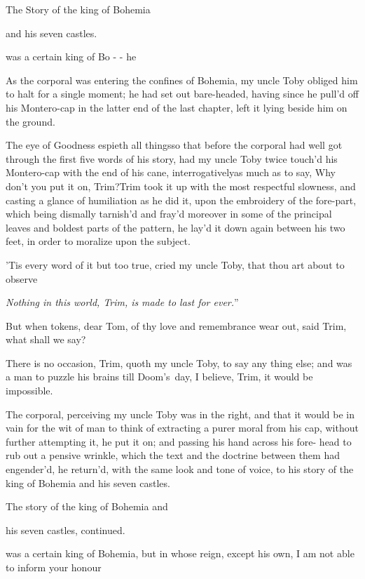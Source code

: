 \documentclass{article}
\begin{document}
\null\smallskip
\centerline{The Story of the king of Bohemia}
\centerline{and his seven castles.}

 was a certain king of\break
Bo - - he\tsh

As the corporal was entering the confines of Bohemia, my
uncle Toby obliged him to halt for a single moment; he had
set out bare-headed, having since he pull’d off his
Montero-cap in the latter end of the last chapter, left it
lying beside him on the ground.

\tsh The eye of Goodness espieth all things\tsh so that before the corporal had
well got through the first five words of his story, had my uncle Toby twice
touch’d his Montero-cap with the end of his cane, interrogatively\tsh as much as to
say, Why don’t you put it on, Trim?\break Trim took it up with the most respectful
slowness, and casting a glance of humiliation as he did it, upon the embroidery of
the fore-part, which being dismally tarnish’d and fray’d moreover in some of the
principal leaves and boldest parts of the pattern, he lay’d it down again between
his two feet, in order to moralize upon the subject.

\tsh ’Tis every word of it but too true, cried my
uncle Toby, that thou art about to observe\tsh

\vfill {}
\eject

\lqq\textit{Nothing in this world, Trim, is}\break
\lqq\textit{made to last for ever.}”

\tsh But when tokens, dear Tom, of thy love and
remembrance wear out, said Trim, what shall we say?

There is no occasion, Trim, quoth my uncle Toby,
to say any thing else; and was a man to puzzle his brains till
Doom’s~day, I believe, Trim, it would be
impossible.

The corporal, perceiving my uncle Toby was in the right,
and that it would be in vain for the wit of man to think of
extracting a purer moral from his cap, without further attempting
it, he put it on; and passing his hand across his fore- head to rub
out a pensive wrinkle, which the text and the doctrine between them
had engender’d, he return’d, with the same look and
tone of voice, to his story of the king of Bohemia and his
seven castles.

\vfill {} \eject\null\smallskip
\centerline{The story of the king of Bohemia and}
\centerline{his seven castles, continued.}

 was a certain king of\break
Bohemia, but in whose reign, except his
own, I am not able to inform your honour\tsh
\end{document}

